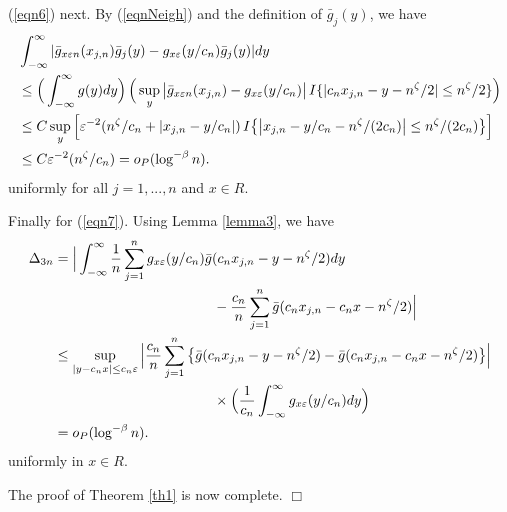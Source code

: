 (\ref{eqn6}) next. By (\ref{eqnNeigh}) and the definition of $\bar{g}_j(y)$, we have
\begin{align}
&\int_{-\infty}^{\infty} | \bar{g}_{x\varepsilon n}(x_{j,n}) \bar{g}_j(y) - g_{x \varepsilon}(y / c_n) \bar{g}_j(y)  | dy\nonumber\\
&\le \Big ( \int_{-\infty}^{\infty} g(y) dy \Big ) \, \Big ( \sup_y \big | \bar{g}_{x\varepsilon n}(x_{j,n})  - g_{x \varepsilon}(y / c_n)  \big |\,  I\{ | c_n x_{j, n} - y - n^{\zeta} / 2| \le n^{\zeta} / 2\} \Big ) \nonumber\\
&\le C \sup_y \Big [ \varepsilon^{-2} ( n^{\zeta} / c_n + |x_{j, n} - y / c_n | ) \,  I\big \{ \big | x_{j, n} - y / c_n - n^{\zeta} /(2c_n)\big | \le n^{\zeta} / (2c_n)\big \} \Big ] \nonumber\\
&\le C\varepsilon^{-2} ( n^{\zeta} / c_n ) = o_{P} (\log^{-\beta} n). \nonumber
\end{align}
uniformly for all $j = 1, ..., n$ and $x \in R$.

Finally for (\ref{eqn7}). Using Lemma \ref{lemma3}, we have
\begin{align}
\Delta_{3n} &=\Big{|}\int_{-\infty}^{\infty}\frac{1}{n}\sum_{j=1}^{n}g_{x\varepsilon}(y/c_n)\bar g(c_nx_{j,n}-y-n^{\zeta}/2)dy\no\\
&\hskip 4cm -\frac{c_n}{n}\sum_{j=1}^{n}\bar g(c_nx_{j,n}-c_n x-n^{\zeta} / 2)\Big{|}\no\\
&\leq\sup_{|y-c_nx|\leq c_{n}\varepsilon}\Big{|} \frac{c_n}{{n}}\sum_{j=1}^{n} \big \{ \bar g(c_nx_{j,n}-y-n^{\zeta}/2)-\bar g(c_nx_{j,n}-c_nx-n^{\zeta}/2) \big \}\Big{|} \no\\
&\hskip 4cm \times \Big(\frac{1}{c_{n}}\int_{-\infty}^{\infty}g_{x\varepsilon}(y/c_n)dy \Big )\no\\
&= o_{P}(\log^{-\beta} n).
\end{align}
uniformly in $x \in R$.

The proof of Theorem \ref{th1} is now complete. $\Box$





